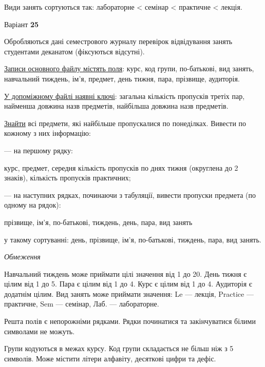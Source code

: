\documentclass[11pt, ukrainian]{article}
\begin{document}
Види занять сортуються так: лабораторне < семінар < практичне < лекція.



\par
\newpage
{\center Варіант  \No \textbf { 25 }\par}
\bigskip
Обробляються дані семестрового журналу перевірок відвідування занять студентами деканатом (фіксуються відсутні). 

\underline{Записи основного файлу містять поля}: курс, код групи, по-батькові, вид занять, навчальний тиждень, ім’я, предмет, день тижня, пара, прізвище, аудиторія.

\underline{У допоміжному файлі наявні ключі}: загальна кількість пропусків третіх пар, найменша довжина назв предметів, найбільша довжина назв предметів.

\underline{Знайти} всі предмети, які найбільше пропускалися по понеділках. Вивести по кожному з них інформацію:\par
{\noindent}--- на першому рядку:\par
курс, предмет, середня кількість пропусків по днях тижня (округлена до 2 знаків), кількість пропусків практичних;

{\noindent}--- на наступних рядках, починаючи з табуляції, вивести пропуски предмета (по одному на рядок):\par
прізвище, ім’я, по-батькові, тиждень, день, пара, вид занять

{\noindent}у такому сортуванні: день, прізвище, ім’я, по-батькові, тиждень, пара, вид занять.


\bigskip\textit{Обмеження}

Навчальний тиждень може приймати цілі значення від 1 до 20.
День тижня є цілим від 1 до 5. Пара є цілим від 1 до 4.
Курс є цілим від 1 до 4. Аудиторія є додатнім цілим.
Вид занять може приймати значення:
Le --- лекція, Practice --- практичне, Sem --- семінар, Лаб. --- лабораторне.

Решта полів є непорожніми рядками.
Рядки починатися та закінчуватися білими символами не можуть.

Групи кодуються в межах курсу.
Код групи складається не більш ніж з 5 символів.
Може містити літери алфавіту, десяткові цифри та дефіс.
\end{document}
